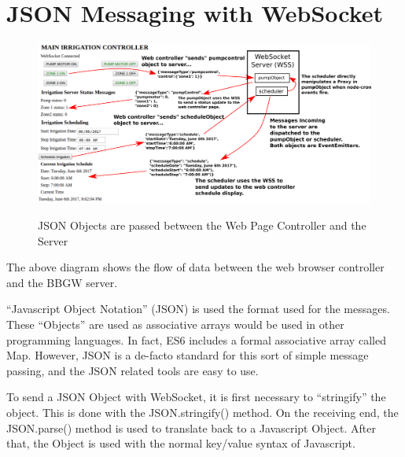 %
%
%

\chapter{JSON Messaging with WebSocket}

\begin{figure}[h]
	\centering
    \includegraphics[width=1.0\textwidth]{diagrams/websocket_comms}
	\centering\bfseries
	\caption{JSON Objects are passed between the Web Page Controller and the 
	Server}
\end{figure}

The above diagram shows the flow of data between the web browser controller and 
the BBGW server.

``Javascript Object Notation'' (JSON) is used the format used for the 
messages.  These ``Objects'' are used as associative arrays would be 
used in other programming languages.  In fact, ES6 includes a formal 
associative array called Map.  However, JSON is a de-facto standard for this 
sort of simple message passing, and the JSON related tools are easy to use.

To send a JSON Object with WebSocket, it is first necessary to ``stringify'' 
the object.  This is done with the JSON.stringify() method.  On the receiving 
end, the JSON.parse() method is used to translate back to a Javascript Object.  
After that, the Object is used with the normal key/value syntax of Javascript.

